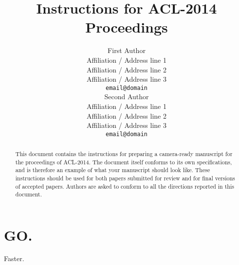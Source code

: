 \documentclass[11pt]{article}
\title{Instructions for ACL-2014 Proceedings}
\author{First Author \\
  Affiliation / Address line 1 \\
  Affiliation / Address line 2 \\
  Affiliation / Address line 3 \\
  {\tt email@domain} \\\And
  Second Author \\
  Affiliation / Address line 1 \\
  Affiliation / Address line 2 \\
  Affiliation / Address line 3 \\
  {\tt email@domain} \\}
\date{}
\begin{document}
\maketitle
\begin{abstract}
  This document contains the instructions for preparing a camera-ready
  manuscript for the proceedings of ACL-2014. The document itself
  conforms to its own specifications, and is therefore an example of
  what your manuscript should look like. These instructions should be
  used for both papers submitted for review and for final versions of
  accepted papers.  Authors are asked to conform to all the directions
  reported in this document.
\end{abstract}

\section{GO.}
Faster. \cite{rudnick-gasser:2013:HyTra}



\end{document}
